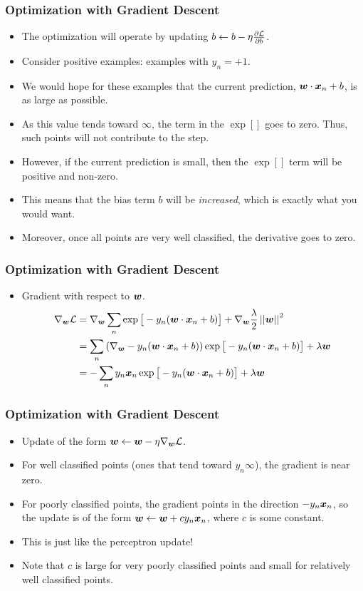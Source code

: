 \documentclass[trans]{beamer}
\begin{document}
\begin{frame}
  \frametitle{Optimization with Gradient Descent}
\begin{itemize}
\item
The optimization will operate by updating $b
\leftarrow b - \eta \frac {\partial \mathcal{L}} {\partial b}$.  
\item Consider positive examples:
examples with $y_n=+1$. 
\item  We would hope for these examples that the
current prediction, ${\boldsymbol{w}} \cdot {\boldsymbol{x}}_n+b$, is as large as possible.
\item 
As this value tends toward $\infty$, the term in the $\exp[]$ goes to
zero.  Thus, such points will not contribute to the step.  
\item However, if
the current prediction is small, then the $\exp[]$ term will be
positive and non-zero.  
\item This means that the bias term $b$ will be
\emph{increased}, which is exactly what you would want.
\item  Moreover,
once all points are very well classified, the derivative goes to zero.
\end{itemize}
\end{frame}

\begin{frame}
  \frametitle{Optimization with Gradient Descent}
\begin{itemize}
\item
Gradient with
respect to ${\boldsymbol{w}}$.
%
\begin{align}
\nabla_{\boldsymbol{w}} \mathcal{L}
&= \nabla_{\boldsymbol{w}} \sum_n \exp\big[-y_n (\boldsymbol{w} \cdot {\boldsymbol{x}}_n+b)\big] 
 + \nabla_{\boldsymbol{w}}\frac {\lambda} 2 \left\vert\left\vert {\boldsymbol{w}} \right\vert\right\vert^2 \\
&= \sum_n \left( \nabla_{\boldsymbol{w}} -y_n (\boldsymbol{w} \cdot {\boldsymbol{x}}_n+b) \right) \exp\big[-y_n (\boldsymbol{w} \cdot {\boldsymbol{x}}_n+b)\big] 
 + \lambda {\boldsymbol{w}} \\
&= -\sum_n y_n {\boldsymbol{x}}_n \exp\big[-y_n (\boldsymbol{w} \cdot {\boldsymbol{x}}_n+b)\big] 
 + \lambda {\boldsymbol{w}}
\end{align}
%
\end{itemize}
\end{frame}

\begin{frame}
  \frametitle{Optimization with Gradient Descent}
\begin{itemize}
\item
Update of the form
${\boldsymbol{w}} \leftarrow {\boldsymbol{w}} - \eta \nabla_{\boldsymbol{w}} \mathcal{L}$.  
\item For well classified points
(ones that tend toward $y_n \infty$), the gradient is near zero.
\item For poorly classified points, the gradient points in the direction
$-y_n{\boldsymbol{x}}_n$, so the update is of the form ${\boldsymbol{w}} \leftarrow {\boldsymbol{w}} + c
y_n{\boldsymbol{x}}_n$, where $c$ is some constant.  
\item This is just like the
perceptron update! 
\item  Note that $c$ is large for very poorly classified
points and small for relatively well classified points.
\end{itemize}
\end{frame}
\end{document}
